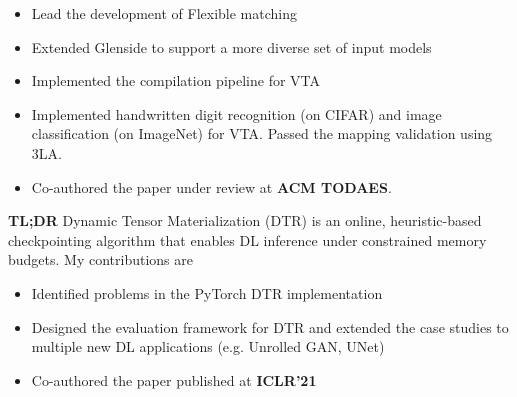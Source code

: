 \documentclass{resume}
\begin{document}
\begin{itemize}
    \item Lead the development of Flexible matching
    \item Extended Glenside to support a more diverse set of input models
    \item Implemented the compilation pipeline for VTA
    \item Implemented handwritten digit recognition (on CIFAR) and image classification (on ImageNet) for VTA. Passed the mapping validation using 3LA.
    \item Co-authored the paper under review at \textbf{ACM TODAES}.
\end{itemize}
\textbf{TL;DR} Dynamic Tensor Materialization (DTR) is an online, heuristic-based checkpointing algorithm that enables DL inference under constrained memory budgets. My contributions are
\begin{itemize} 
    \item Identified problems in the PyTorch DTR implementation
    \item Designed the evaluation framework for DTR and extended the case studies to multiple new DL applications (e.g. Unrolled GAN, UNet)
    \item Co-authored the paper published at \textbf{ICLR'21}
\end{itemize}
\end{document}
